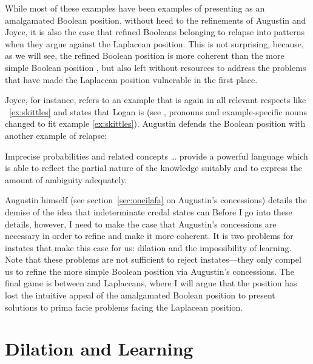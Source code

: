 \documentclass[phd,12pt,oneside]{ubcthesis}
\begin{document}
While most of these examples have been examples of presenting
{\anderson} as an amalgamated Boolean position, without heed to the
refinements of Augustin and Joyce, it is also the case that refined
Booleans belonging to {\augustin} relapse into {\anderson} patterns
when they argue against the Laplacean position. This is not
surprising, because, as we will see, the refined Boolean position
{\augustin} is more coherent than the more simple Boolean position
{\anderson}, but also left without resources to address the problems
that have made the Laplacean position vulnerable in the first place.

Joyce, for instance, refers to an example that is again in all
relevant respects like {\xample}~\ref{ex:skittles} and states that Logan
is  (see ,
pronouns and example-specific nouns changed to fit example
\ref{ex:skittles}). Augustin defends the Boolean position with another
example of relapse:

\begin{quotex}
  Imprecise probabilities and related concepts {\ldots} provide a
  powerful language which is able to reflect the partial nature of the
  knowledge suitably and to express the amount of ambiguity
  adequately. 
\end{quotex}

Augustin himself (see section~\ref{sec:oneilafa} on Augustin's
concessions) details the demise of the idea that indeterminate credal
states can  Before
I go into these details, however, I need to make the case that
Augustin's concessions are necessary in order to refine {\anderson}
and make it more coherent. It is two problems for instates that make
this case for us: dilation and the impossibility of learning. Note
that these problems are not sufficient to reject instates---they only
compel us to refine the more simple Boolean position via Augustin's
concessions. The final game is between {\augustin} and Laplaceans,
where I will argue that the {\augustin} position has lost the
intuitive appeal of the amalgamated Boolean position to present
solutions to prima facie problems facing the Laplacean position.

\section{Dilation and Learning}
\label{sec:aequahfo}
\end{document}
